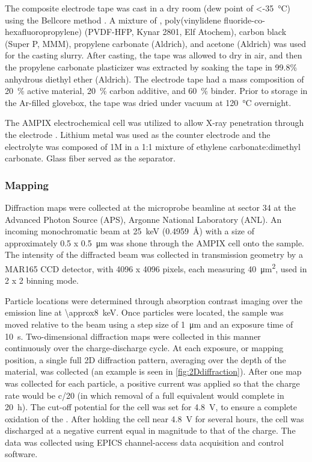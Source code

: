 \documentclass{article}
\begin{document}
The \nca{} composite electrode tape was cast in a dry room (dew point
of \SI{<-35}{\celsius}) using the Bellcore method
\cite{Tarascon1996}. A mixture of \nca{}, poly(vinylidene
fluoride-co-hexafluoropropylene) (PVDF-HFP, Kynar 2801, Elf Atochem),
carbon black (Super P, MMM), propylene carbonate (Aldrich), and
acetone (Aldrich) was used for the casting slurry. After casting, the
tape was allowed to dry in air, and then the propylene carbonate
plasticizer was extracted by soaking the tape in 99.8\% anhydrous
diethyl ether (Aldrich). The electrode tape had a mass composition of
\SI{20}{\percent} active material, \SI{20}{\percent} carbon additive,
and \SI{60}{\percent} binder. Prior to storage in the Ar-filled
glovebox, the tape was dried under vacuum at \SI{120}{\celsius}
overnight.

The AMPIX electrochemical cell was utilized to allow X-ray penetration
through the electrode \cite{borkiewicz2012}. Lithium metal was used as
the counter electrode and the electrolyte was composed of 1M
 in a 1:1 mixture of ethylene carbonate:dimethyl
carbonate. Glass fiber served as the separator.

\subsubsection{Mapping}
Diffraction maps were collected at the microprobe beamline at sector
34 at the Advanced Photon Source (APS), Argonne National Laboratory
(ANL). An incoming monochromatic beam at \SI{25}{\kilo\electronvolt}
(\SI{0.4959}{\angstrom}) with a size of approximately 0.5 x
\SI{0.5}{\micro\meter} was shone through the AMPIX cell onto the
sample. The intensity of the diffracted beam was collected in
transmission geometry by a MAR165 CCD detector, with 4096 x 4096
pixels, each measuring \SI{40}{\square\micro\meter}, used in 2 x 2
binning mode.

Particle locations were determined through absorption contrast imaging
over the  emission line at
\SI{\approx8}{\kilo\electronvolt}. Once particles were located, the
sample was moved relative to the beam using a step size of
\SI{1}{\micro\meter} and an exposure time of
\SI{10}{\second}. Two-dimensional diffraction maps were collected in
this manner continuously over the charge-discharge cycle. At each
exposure, or mapping position, a single full 2D diffraction pattern,
averaging over the depth of the material, was collected (an example is
seen in \ref{fig:2Ddiffraction}). After one map was collected for each
particle, a positive current was applied so that the charge rate would
be c/20 (in which removal of a full  equivalent would complete
in \SI{20}{\hour}). The cut-off potential for the cell was set for
\SI{4.8}{\volt}, to ensure a complete oxidation of the \nca{}. After
holding the cell near \SI{4.8}{\volt} for several hours, the cell was
discharged at a negative current equal in magnitude to that of the
charge. The data was collected using EPICS channel-access data
acquisition and control software.
\end{document}
